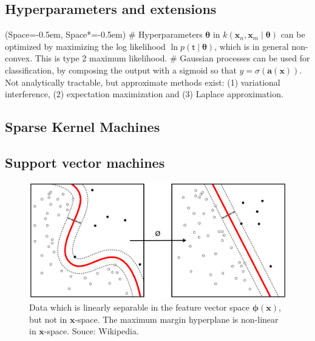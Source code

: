 \documentclass[12pt, a4paper]{article}
\newcommand{\listSpace}{-0.5em}%
\newcommand{\vect}[1]{\bm{#1}}
\begin{document}
\subsection*{Hyperparameters and extensions}
\begin{easylist}[itemize]
	\ListProperties(Space=\listSpace, Space*=\listSpace)
	# Hyperparameters $\vect{\theta}$ in $k(\vect{x}_n, \vect{x}_m \mid \vect{\theta})$ can be optimized by maximizing the log likelihood $\ln p (\mathsf{t} \mid \vect{\theta})$, which is in general non-convex.
	This is type 2 maximum likelihood.
	# Gaussian processes can be used for classification, by composing the output with a sigmoid so that $y = \sigma (\vect{a}(\vect{x}))$.
	Not analytically tractable, but approximate methods exist: (1) variational interference, (2) expectation maximization and (3) Laplace approximation.
\end{easylist}

\subsection{Sparse Kernel Machines}


\subsection*{Support vector machines}

	\begin{figure}[ht!]
		\centering
		\includegraphics[width=0.7\linewidth]{figs/Kernel_Machine.png}
		\caption{Data which is linearly separable in the feature vector space $\vect{\phi}(\vect{x})$, but not in $\vect{x}$-space.
			The maximum margin hyperplane is non-linear in $\vect{x}$-space.
			Souce: Wikipedia.}
		\label{fig:Kernel_Machine}
	\end{figure}
\end{document}
